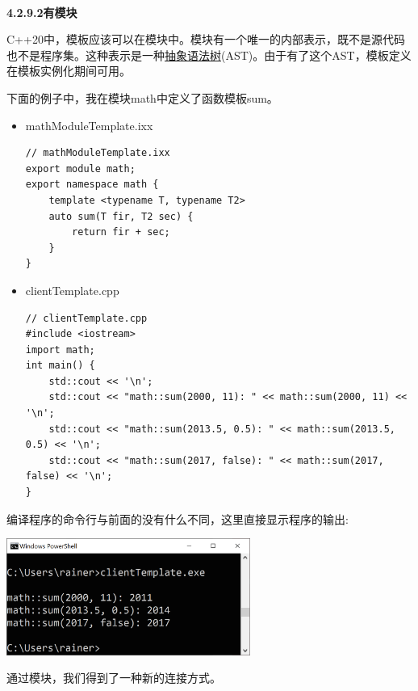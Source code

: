 \hspace*{\fill} \\ %
\noindent
\textbf{4.2.9.2\hspace{0.2cm}有模块}

C++20中，模板应该可以在模块中。模块有一个唯一的内部表示，既不是源代码也不是程序集。这种表示是一种\href{https://en.wikipedia.org/wiki/Abstract_syntax_tree}{抽象语法树}(AST)。由于有了这个AST，模板定义在模板实例化期间可用。

下面的例子中，我在模块math中定义了函数模板sum。

\begin{itemize}
\item 
mathModuleTemplate.ixx

\begin{lstlisting}[style=styleCXX]
// mathModuleTemplate.ixx
export module math;
export namespace math {
	template <typename T, typename T2>
	auto sum(T fir, T2 sec) {
		return fir + sec;
	}
}
\end{lstlisting}

\item 
clientTemplate.cpp

\begin{lstlisting}[style=styleCXX]
// clientTemplate.cpp
#include <iostream>
import math;
int main() {
	std::cout << '\n';
	std::cout << "math::sum(2000, 11): " << math::sum(2000, 11) << '\n';
	std::cout << "math::sum(2013.5, 0.5): " << math::sum(2013.5, 0.5) << '\n';
	std::cout << "math::sum(2017, false): " << math::sum(2017, false) << '\n';
}
\end{lstlisting}
\end{itemize}

编译程序的命令行与前面的没有什么不同，这里直接显示程序的输出:

\begin{center}
\includegraphics[width=0.6\textwidth]{content/3/chapter4/images/24.png}\\
\end{center}

通过模块，我们得到了一种新的连接方式。


